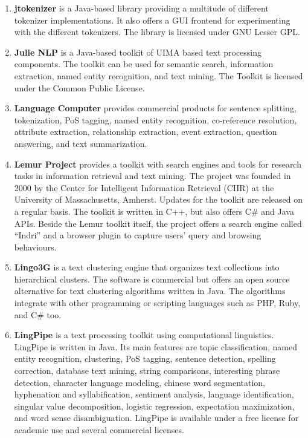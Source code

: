 \begin{enumerate}
	\item \textbf{jtokenizer} \cite{jtokenizer} is a Java-based library providing a multitude of different tokenizer implementations. It also offers a GUI frontend for experimenting with the different tokenizers. The library is licensed under GNU Lesser GPL.

	\item \textbf{Julie NLP} \cite{tomanek2007uima,hahn2008overview} is a Java-based toolkit of UIMA based text processing components. The toolkit can be used for semantic search, information extraction, named entity recognition, and text mining.
The Toolkit is licensed under the Common Public License.

	\item \textbf{Language Computer} \cite{lanuagecomputer} provides commercial products for sentence splitting, tokenization, PoS tagging, named entity recognition, co-reference resolution, attribute extraction, relationship extraction, event extraction, question answering, and text summarization.

	\item \textbf{Lemur Project} \cite{lemur} provides a toolkit with search engines and tools for research tasks in information retrieval and text mining. The project was founded in 2000 by the Center for Intelligent Information Retrieval (CIIR) at the University of Massachusetts, Amherst. Updates for the toolkit are released on a regular basis. The toolkit is written in C++, but also offers C\# and Java APIs. Beside the Lemur toolkit itself, the project offers a search engine called ``Indri'' and a browser plugin to capture users' query and browsing behaviours.

	\item \textbf{Lingo3G} \cite{lingo3g} is a text clustering engine that organizes text collections into hierarchical clusters.
The software is commercial but \cite{stefanowski2003carrot} offers an open source alternative for text clustering algorithms written in Java. The algorithms integrate with other programming or scripting languages such as PHP, Ruby, and C\# too.

	\item \textbf{LingPipe} \cite{lingpipe} is a text processing toolkit using computational linguistics. LingPipe is written in Java. Its main features are topic classification, named entity recognition, clustering, PoS tagging, sentence detection, spelling correction, database text mining, string comparisons, interesting phrase detection, character language modeling, chinese word segmentation, hyphenation and syllabification, sentiment analysis, language identification, singular value decomposition, logistic regression, expectation maximization, and word sense disambiguation.
LingPipe is available under a free license for academic use and several commercial licenses.


\end{enumerate}
